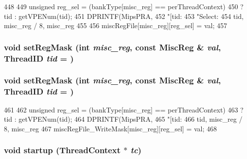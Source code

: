 \begin{DoxyCode}
448 {
449     unsigned reg_sel = (bankType[misc_reg] == perThreadContext)
450         ? tid : getVPENum(tid);
451     DPRINTF(MipsPRA,
452             "[tid:%
453             "Select:%
454             tid, misc_reg / 8, misc_reg %
455 
456     miscRegFile[misc_reg][reg_sel] = val;
457 }
\end{DoxyCode}
\hypertarget{classMipsISA_1_1ISA_a01507af6f09e43b4f9ece624fdafb1cc}{
\subsubsection[{setRegMask}]{\setlength{\rightskip}{0pt plus 5cm}void setRegMask (int {\em misc\_\-reg}, \/  const {\bf MiscReg} \& {\em val}, \/  {\bf ThreadID} {\em tid} = {})}}
\label{classMipsISA_1_1ISA_a01507af6f09e43b4f9ece624fdafb1cc}
\hypertarget{classMipsISA_1_1ISA_a01507af6f09e43b4f9ece624fdafb1cc}{
\subsubsection[{setRegMask}]{\setlength{\rightskip}{0pt plus 5cm}void setRegMask (int {\em misc\_\-reg}, \/  const {\bf MiscReg} \& {\em val}, \/  {\bf ThreadID} {\em tid} = {})}}
\label{classMipsISA_1_1ISA_a01507af6f09e43b4f9ece624fdafb1cc}



\begin{DoxyCode}
461 {
462     unsigned reg_sel = (bankType[misc_reg] == perThreadContext)
463         ? tid : getVPENum(tid);
464     DPRINTF(MipsPRA,
465             "[tid:%
466             tid, misc_reg / 8, misc_reg %
467     miscRegFile_WriteMask[misc_reg][reg_sel] = val;
468 }
\end{DoxyCode}
\hypertarget{classMipsISA_1_1ISA_a769e733729615c529fdb54f538f11dba}{
\subsubsection[{startup}]{\setlength{\rightskip}{0pt plus 5cm}void startup ({\bf ThreadContext} $\ast$ {\em tc})}}
\label{classMipsISA_1_1ISA_a769e733729615c529fdb54f538f11dba}




